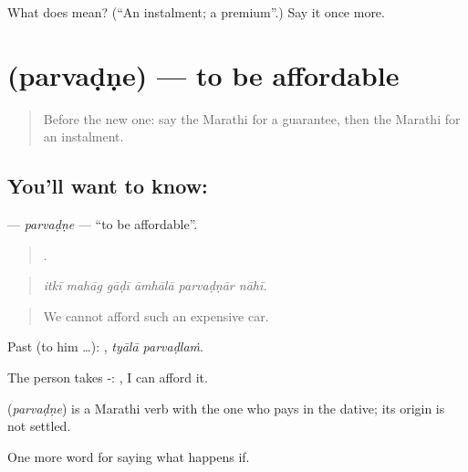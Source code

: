 \begin{tcolorbox}[breakable,colback=teal!4,colframe=teal!35!black,title={Before you move on}]
What does  mean? (\textquotedblleft{}An instalment; a premium\textquotedblright{}.) Say it once more.
\end{tcolorbox}
\section[\texorpdfstring{\mr{परवडणे} (parvaḍṇe)}{परवडणे (parvaḍṇe)}]{ (parvaḍṇe) — to be affordable}

\label{lesson:MR-C540-parvadne}



\begin{quote}
Before the new one: say the Marathi for a guarantee, then the Marathi for an instalment.
\end{quote}

\subsection*{You'll want to know: }
\textbf{} — \emph{parvaḍṇe} — \textquotedblleft{}to be affordable\textquotedblright{}.

\begin{quote}
     .
\end{quote}

\begin{quote}
\emph{itkī mahāg gāḍī āmhālā parvaḍṇār nāhī.}
\end{quote}

\begin{quote}
We cannot afford such an expensive car.
\end{quote}

Past (to him …):  , \emph{tyālā parvaḍlaṁ}.

The person takes -:  , I can afford it.

\begin{cousinweb}
\textbf{} (\emph{parvaḍṇe}) is a Marathi verb with the one who pays in the dative; its origin is not settled.
\end{cousinweb}

\begin{grammarlens}[title={What you've built}]
One more word for saying what happens if.
\end{grammarlens}

